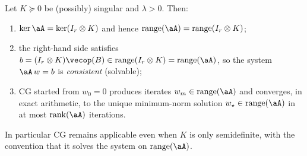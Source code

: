 \begin{lemma}
\label{lem:singular}
Let $K\succeq0$ be (possibly) singular and $\lambda>0$. Then:
\begin{enumerate}[label=\textup{(\roman*)}]
\item $\ker\aA=\ker(I_r\otimes K)$ and hence
      $\operatorname{range}(\aA)=\operatorname{range}(I_r\otimes K)$;
\item the right-hand side satisfies
      $b=(I_r\otimes K)\vecop(B)\in\operatorname{range}(I_r\otimes K)
      =\operatorname{range}(\aA)$, so the system $\aA\,w=b$ is
      \emph{consistent} (solvable);
\item CG started from $w_0=0$ produces iterates $w_m\in\operatorname{range}(\aA)$
      and converges, in exact arithmetic, to the unique minimum-norm solution
      $w_\star\in\operatorname{range}(\aA)$ in at most $\operatorname{rank}(\aA)$
      iterations.
\end{enumerate}
In particular CG remains applicable even when $K$ is only semidefinite, with
the convention that it solves the system on $\operatorname{range}(\aA)$.
\end{lemma}

